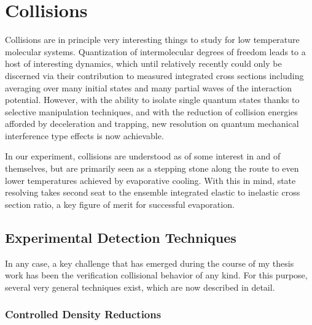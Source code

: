 \ifx\justbeingincluded\undefined


\fi

\chapter{Collisions}
\label{chapter:collisions}


Collisions are in principle very interesting things to study for low temperature molecular systems. 
Quantization of intermolecular degrees of freedom leads to a host of interesting dynamics, which until relatively recently could only be discerned via their contribution to measured integrated cross sections including averaging over many initial states and many partial waves of the interaction potential.
However, with the ability to isolate single quantum states thanks to selective manipulation techniques, and with the reduction of collision energies afforded by deceleration and trapping, new resolution on quantum mechanical interference type effects is now achievable.

In our experiment, collisions are understood as of some interest in and of themselves, but are primarily seen as a stepping stone along the route to even lower temperatures achieved by evaporative cooling.
With this in mind, state resolving takes second seat to the ensemble integrated elastic to inelastic cross section ratio, a key figure of merit for successful evaporation.

\section{Experimental Detection Techniques}

In any case, a key challenge that has emerged during the course of my thesis work has been the verification collisional behavior of any kind.
For this purpose, several very general techniques exist, which are now described in detail.

\subsection{Controlled Density Reductions}

